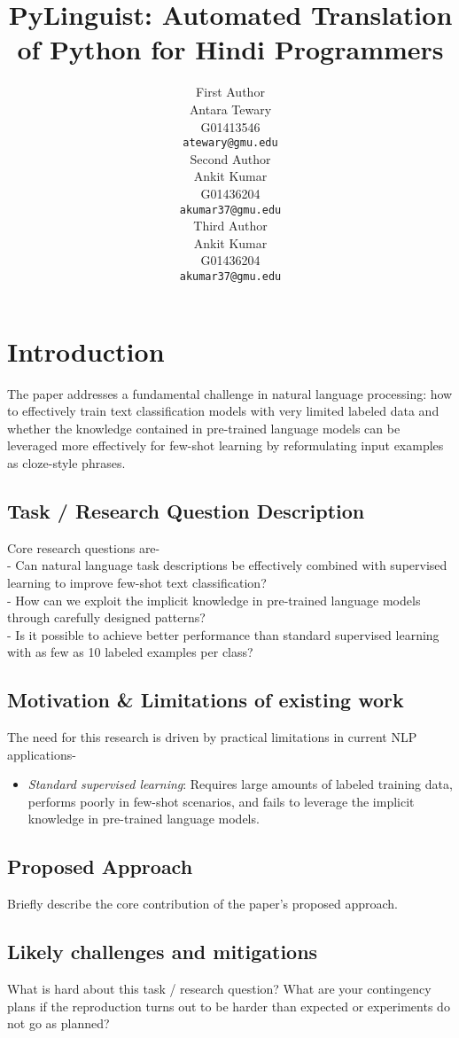 \documentclass[11pt,a4paper]{article}
\title{PyLinguist: Automated Translation of Python for Hindi Programmers}
\author{First Author \\
  Antara Tewary\\ 
  G01413546\\
  \texttt{atewary@gmu.edu} \\\And
  Second Author \\
  Ankit Kumar\\ 
  G01436204\\
  \texttt{akumar37@gmu.edu}\\\And
  Third Author \\
  Ankit Kumar\\ 
  G01436204\\
  \texttt{akumar37@gmu.edu}}
\date{}
\begin{document}
\maketitle

\section{Introduction}

The paper addresses a fundamental challenge in natural language processing: how to effectively train text classification models with very limited labeled data and whether the knowledge contained in pre-trained language models can be leveraged more effectively for few-shot learning by reformulating input examples as cloze-style phrases.
            \subsection{Task / Research Question Description} 
            Core research questions are-\\
            - Can natural language task descriptions be effectively combined with supervised learning to improve few-shot text classification?\\
            - How can we exploit the implicit knowledge in pre-trained language models through carefully designed patterns?\\
            - Is it possible to achieve better performance than standard supervised learning with as few as 10 labeled examples per class?
            \subsection{Motivation \& Limitations of existing work} 
            The need for this research is driven by practical limitations in current NLP applications-
            \begin{itemize}
              \item \textit{Standard supervised learning}: Requires large amounts of labeled training data, performs poorly in few-shot scenarios, and fails to leverage the implicit knowledge in pre-trained language models.
            \end{itemize} 
            \subsection{Proposed Approach} 
            Briefly describe the core contribution of the paper's proposed approach.
            \subsection{Likely challenges and mitigations} 
            What is hard about this task / research question? What are your contingency plans if the reproduction turns out to be harder than expected or experiments do not go as planned? 
\end{document}
